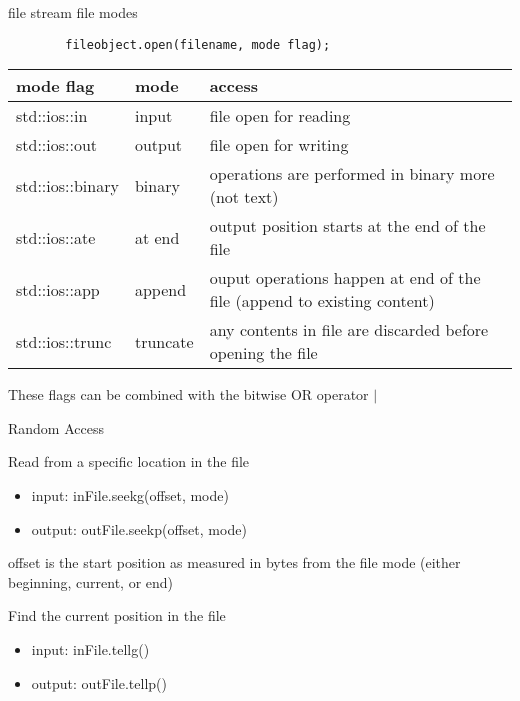 \documentclass[xcolor={dvipsnames}]{beamer}
\begin{document}
\begin{frame}[fragile]{file stream file modes}
	\begin{center}
	\begin{verbatim}
		fileobject.open(filename, mode flag);
	\end{verbatim}
	\end{center}
\begin{table}
\begin{tabular}{|l|l|p{5cm}|}
	\hline
	\textbf{mode flag} & \textbf{mode} & {access}\\
	\hline
	std::ios::in & input & file open for reading \\
	\hline
	std::ios::out & output & file open for writing\\
	\hline
	std::ios::binary & binary & operations are performed in binary more (not text)\\
	\hline
	std::ios::ate & at end & output position starts at the end of the file \\
	\hline
	std::ios::app & append & ouput operations happen at end of the file (append to existing content)\\
	\hline
	std::ios::trunc & truncate & any contents in file are discarded before opening the file\\
	\hline
\end{tabular}
\end{table}
These flags can be combined with the bitwise OR operator $\mid$
\end{frame}

\begin{frame}{Random Access}
	\begin{block}{Read from a specific location in the file}
			\begin{itemize}
				\item input: inFile.seekg(offset, mode)
				\item output: outFile.seekp(offset, mode)
			\end{itemize}
		offset is the start position as measured in bytes from the file mode (either beginning, current, or end)
	\end{block}
	\begin{block}{Find the current position in the file}
			\begin{itemize}
				\item input: inFile.tellg()
				\item output: outFile.tellp()
			\end{itemize}
	\end{block}
\end{frame}
\end{document}
